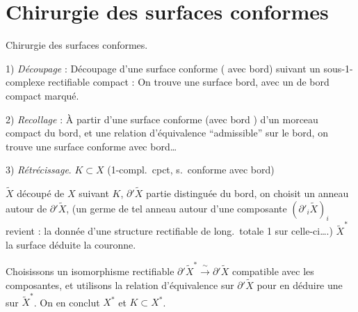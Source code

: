 \documentclass[11pt,a4paper]{article}
\begin{document}
\section{Chirurgie des surfaces conformes}

Chirurgie des surfaces conformes.

1) \emph{Découpage} : Découpage d'une surface conforme \struck{\ill{}}
( avec bord) suivant un sous-1-complexe rectifiable
compact : On trouve une surface   bord, avec un
  de bord compact marqué.

2) \emph{Recollage} : À partir d'une surface conforme (avec bord
\struck{\ill{}})  d'un morceau compact du bord, et une relation
d'équivalence “admissible”  sur le bord,
\struck{\ill{}} on trouve une surface conforme avec bord…

3) \emph{Rétrécissage}. $K \subset X$ (1-compl.\ cpct, s.\ conforme avec
bord)

$\widetilde{X}$ découpé de $X$ suivant $K$, $\partial'\widetilde{X}$ partie
distinguée du bord, on choisit un anneau autour de
$\partial'\widetilde{X}$,  (un germe de tel anneau autour
d'une composante $(\partial'_{i}\widetilde{X})_{i}$ revient : la donnée d'une
structure   rectifiable de
long.\ totale 1 sur celle-ci….) $\widetilde{X}^{*}$ la surface
 \struck{\ill{}}  \ill{} déduite
\ill{} la couronne.

Choisissons un isomorphisme rectifiable
$\partial'\widetilde{X}^{*} \xrightarrow{\ \sim\ } \partial'\widetilde{X}$
compatible avec les composantes, et utilisons la relation d'équivalence
 sur $\partial'\widetilde{X}$ pour en déduire une
sur $\widetilde{X}^{*}$. On en conclut \struck{\ill{}} $X^{*}$ et
$K \subset X^{*}$.

\end{document}
